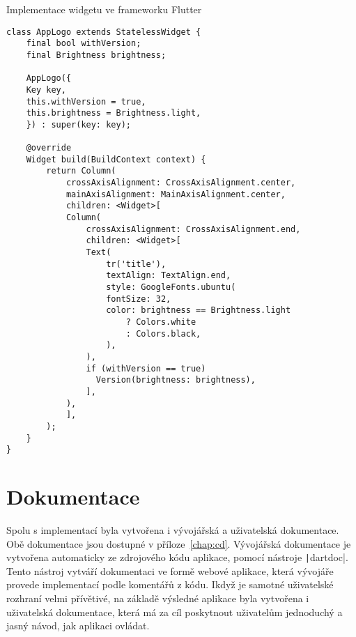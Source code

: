 \begin{listing}
    \caption{Implementace widgetu ve frameworku Flutter}
    \label{code:implementation-1}
    \begin{verbatim}
class AppLogo extends StatelessWidget {
    final bool withVersion;
    final Brightness brightness;

    AppLogo({
    Key key,
    this.withVersion = true,
    this.brightness = Brightness.light,
    }) : super(key: key);

    @override
    Widget build(BuildContext context) {
        return Column(
            crossAxisAlignment: CrossAxisAlignment.center,
            mainAxisAlignment: MainAxisAlignment.center,
            children: <Widget>[
            Column(
                crossAxisAlignment: CrossAxisAlignment.end,
                children: <Widget>[
                Text(
                    tr('title'),
                    textAlign: TextAlign.end,
                    style: GoogleFonts.ubuntu(
                    fontSize: 32,
                    color: brightness == Brightness.light
                        ? Colors.white
                        : Colors.black,
                    ),
                ),
                if (withVersion == true)
                  Version(brightness: brightness),
                ],
            ),
            ],
        );
    }
}
    \end{verbatim}
\end{listing}


\section{Dokumentace}

Spolu s implementací byla vytvořena i vývojářská a uživatelská dokumentace.
Obě dokumentace jsou dostupné v příloze~\ref{chap:cd}.
Vývojářská dokumentace je vytvořena automaticky ze zdrojového kódu aplikace,
pomocí nástroje \texttt|dartdoc|.
Tento nástroj vytváří dokumentaci ve formě webové aplikace,
která vývojáře provede implementací podle komentářů z kódu.
Ikdyž je samotné uživatelské rozhraní velmi přívětivé,
na základě výsledné aplikace byla vytvořena i uživatelská dokumentace,
která má za cíl poskytnout uživatelům jednoduchý a jasný návod,
jak aplikaci ovládat.

